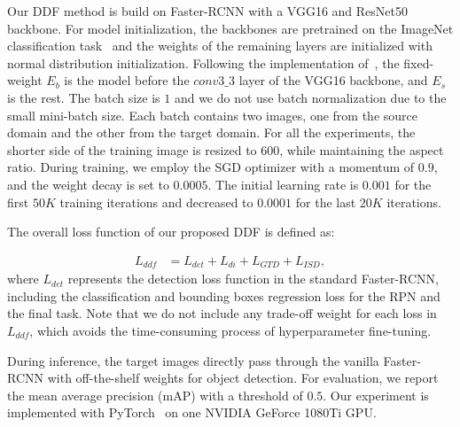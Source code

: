 \documentclass[journal]{IEEEtran}
\begin{document}
Our DDF method is build on Faster-RCNN with a VGG16 and ResNet50 backbone. For model initialization, the backbones are pretrained on the ImageNet classification task~\cite{deng2009imagenet} and the weights of the remaining layers are initialized with normal distribution initialization. Following the implementation of~\cite{saito2019strong,chen2020harmonizing,xu2020cross}, the fixed-weight $E_{b}$ is the model before the $conv3\_3$ layer of the VGG16 backbone, and $E_{s}$ is the rest. The batch size is $1$ and we do not use batch normalization due to the small mini-batch size. Each batch contains two images, one from the source domain and the other from the target domain. For all the experiments, the shorter side of the training image is resized to $600$, while maintaining the aspect ratio. During training, we employ the SGD optimizer with a momentum of $0.9$, and the weight decay is set to $0.0005$. The initial learning rate is $0.001$ for the first $50K$ training iterations and decreased to $0.0001$ for the last $20K$ iterations. 


The overall loss function of our proposed DDF is defined as:

\begin{equation}
\begin{aligned}
L_{ddf} & = L_{det} + L_{di} + L_{GTD} + L_{ISD}, 
\label{equ-loss-overall}
\end{aligned}
\end{equation}
where $L_{det}$ represents the detection loss function in the standard Faster-RCNN, including the classification and bounding boxes regression loss for the RPN and the final task. Note that we do not include any trade-off weight for each loss in $L_{ddf}$, which avoids the time-consuming process of hyperparameter fine-tuning. {}

During inference, the target images directly pass through the vanilla Faster-RCNN with off-the-shelf weights for object detection. For evaluation, we report the mean average precision (mAP) with a threshold of $0.5$. Our experiment is implemented with PyTorch~\cite{paszke2017automatic} on one NVIDIA GeForce 1080Ti GPU.
\end{document}
